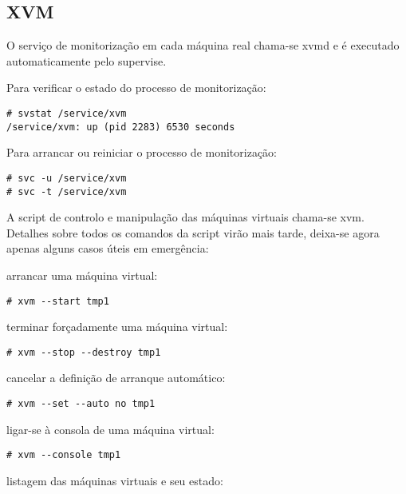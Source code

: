 \subsection{XVM}

O serviço de monitorização em cada máquina real chama-se xvmd e é executado automaticamente pelo supervise.

Para verificar o estado do processo de monitorização:

\begin{Verbatim}[commandchars=\\\{\}]
# svstat /service/xvm
/service/xvm: up (pid 2283) 6530 seconds
\end{Verbatim}

Para arrancar ou reiniciar o processo de monitorização:

\begin{Verbatim}[commandchars=\\\{\}]
# svc -u /service/xvm
# svc -t /service/xvm
\end{Verbatim}

A script de controlo e manipulação das máquinas virtuais chama-se xvm. Detalhes sobre todos os comandos da script virão mais tarde, deixa-se agora apenas alguns casos úteis em emergência:

arrancar uma máquina virtual:

\begin{Verbatim}[commandchars=\\\{\}]
# xvm --start tmp1
\end{Verbatim}

terminar forçadamente uma máquina virtual:

\begin{Verbatim}[commandchars=\\\{\}]
# xvm --stop --destroy tmp1
\end{Verbatim}

cancelar a definição de arranque automático:

\begin{Verbatim}[commandchars=\\\{\}]
# xvm --set --auto no tmp1
\end{Verbatim}

ligar-se à consola de uma máquina virtual:

\begin{Verbatim}[commandchars=\\\{\}]
# xvm --console tmp1
\end{Verbatim}

listagem das máquinas virtuais e seu estado:

